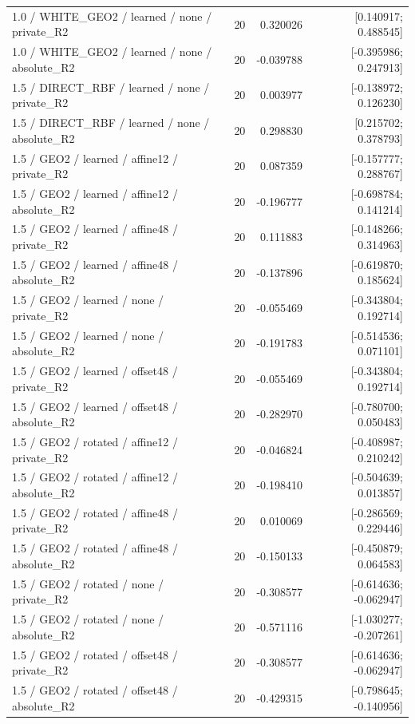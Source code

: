 \begin{longtable}{p{.56\linewidth}rrr}
1.0 / WHITE\_GEO2 / learned / none / private\_R2 & 20 & 0.320026 & [0.140917; 0.488545] \\
1.0 / WHITE\_GEO2 / learned / none / absolute\_R2 & 20 & -0.039788 & [-0.395986; 0.247913] \\
1.5 / DIRECT\_RBF / learned / none / private\_R2 & 20 & 0.003977 & [-0.138972; 0.126230] \\
1.5 / DIRECT\_RBF / learned / none / absolute\_R2 & 20 & 0.298830 & [0.215702; 0.378793] \\
1.5 / GEO2 / learned / affine12 / private\_R2 & 20 & 0.087359 & [-0.157777; 0.288767] \\
1.5 / GEO2 / learned / affine12 / absolute\_R2 & 20 & -0.196777 & [-0.698784; 0.141214] \\
1.5 / GEO2 / learned / affine48 / private\_R2 & 20 & 0.111883 & [-0.148266; 0.314963] \\
1.5 / GEO2 / learned / affine48 / absolute\_R2 & 20 & -0.137896 & [-0.619870; 0.185624] \\
1.5 / GEO2 / learned / none / private\_R2 & 20 & -0.055469 & [-0.343804; 0.192714] \\
1.5 / GEO2 / learned / none / absolute\_R2 & 20 & -0.191783 & [-0.514536; 0.071101] \\
1.5 / GEO2 / learned / offset48 / private\_R2 & 20 & -0.055469 & [-0.343804; 0.192714] \\
1.5 / GEO2 / learned / offset48 / absolute\_R2 & 20 & -0.282970 & [-0.780700; 0.050483] \\
1.5 / GEO2 / rotated / affine12 / private\_R2 & 20 & -0.046824 & [-0.408987; 0.210242] \\
1.5 / GEO2 / rotated / affine12 / absolute\_R2 & 20 & -0.198410 & [-0.504639; 0.013857] \\
1.5 / GEO2 / rotated / affine48 / private\_R2 & 20 & 0.010069 & [-0.286569; 0.229446] \\
1.5 / GEO2 / rotated / affine48 / absolute\_R2 & 20 & -0.150133 & [-0.450879; 0.064583] \\
1.5 / GEO2 / rotated / none / private\_R2 & 20 & -0.308577 & [-0.614636; -0.062947] \\
1.5 / GEO2 / rotated / none / absolute\_R2 & 20 & -0.571116 & [-1.030277; -0.207261] \\
1.5 / GEO2 / rotated / offset48 / private\_R2 & 20 & -0.308577 & [-0.614636; -0.062947] \\
1.5 / GEO2 / rotated / offset48 / absolute\_R2 & 20 & -0.429315 & [-0.798645; -0.140956] \\

\end{longtable}
